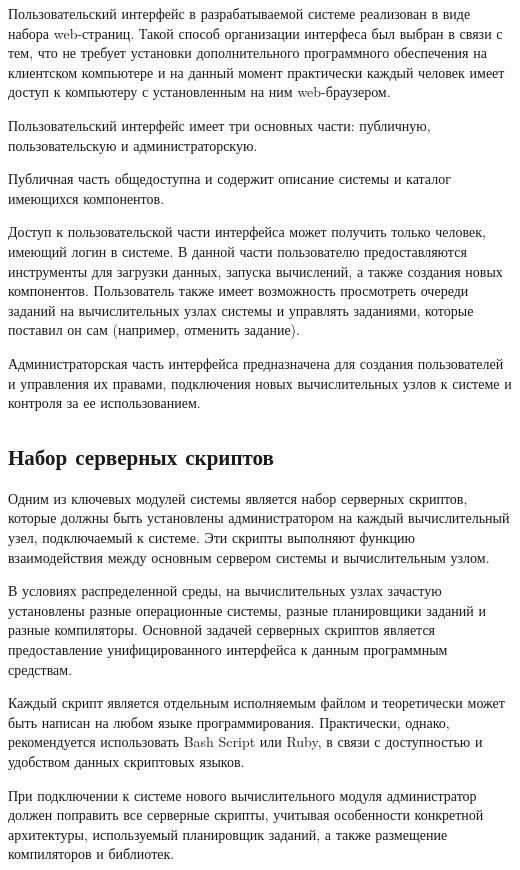 Пользовательский интерфейс в разрабатываемой системе реализован в виде набора web-страниц. Такой способ организации интерфеса был выбран в связи с тем, что не требует установки дополнительного программного обеспечения на клиентском компьютере и на данный момент практически каждый человек имеет доступ к компьютеру с установленным на ним web-браузером.

Пользовательский интерфейс имеет три основных части: публичную, пользовательскую и администраторскую.

Публичная часть общедоступна и содержит описание системы и каталог имеющихся компонентов.

Доступ к пользовательской части интерфейса может получить только человек, имеющий логин в системе. В данной части пользователю предоставляются инструменты для загрузки данных, запуска вычислений, а также создания новых компонентов. Пользователь также имеет возможность просмотреть очереди заданий на вычислительных узлах системы и управлять заданиями, которые поставил он сам (например, отменить задание).

Администраторская часть интерфейса предназначена для создания пользователей и управления их правами, подключения новых вычислительных узлов к системе и контроля за ее использованием.

\subsection{Набор серверных скриптов}    

Одним из ключевых модулей системы является набор серверных скриптов, которые должны быть установлены администратором на каждый вычислительный узел, подключаемый к системе. Эти скрипты выполняют функцию взаимодействия между основным сервером системы и вычислительным узлом. 

В условиях распределенной среды, на вычислительных узлах зачастую установлены разные операционные системы, разные планировщики заданий и разные компиляторы. Основной задачей серверных скриптов является предоставление унифицированного интерфейса к данным программным средствам.

Каждый скрипт является отдельным исполняемым файлом и теоретически может быть написан на любом языке программирования. Практически, однако, рекомендуется использовать Bash Script или Ruby, в связи с доступностью и удобством данных скриптовых языков.            

При подключении к системе нового вычислительного модуля администратор должен поправить все серверные скрипты, учитывая особенности конкретной архитектуры, используемый планировщик заданий, а также размещение компиляторов и библиотек.

